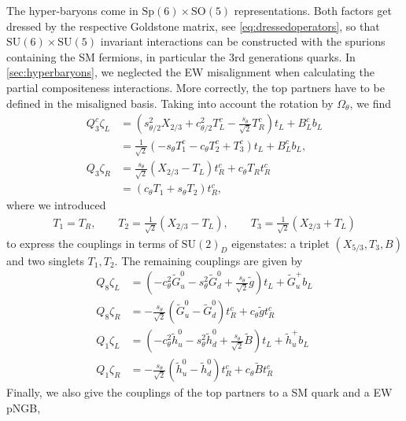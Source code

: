 \documentclass[preprintnumbers,nofootinbib,showpacs,eqsecnum,pre,12pt]{revtex4-1}
\newcommand{\SO}{\text{SO}}
\newcommand{\SU}{\text{SU}}
\newcommand{\Sp}{\text{Sp}}
\begin{document}
The hyper-baryons come in $\Sp(6)\times \SO(5)$ representations. Both factors get
dressed by the respective Goldstone matrix, see \cref{eq:dressedoperators}, so that $\SU(6)\times \SU(5)$ invariant
interactions can be constructed with the spurions containing the SM fermions, in particular
the 3rd generations quarks. 
In \cref{sec:hyperbaryons}, we neglected the EW misalignment when calculating the partial compositeness interactions.
More correctly, the top partners have to be defined in the misaligned basis.
Taking into account the rotation by $\Omega_\theta$, we find
\begin{align}
    Q_3^c \zeta_L 
	&= \left( s_{\theta/2}^2 X_{2/3} + c_{\theta/2}^2 T^c_L - \frac{s_\theta}{\sqrt{2}} T^{ c}_R \right) t_L+B^c_L b_L  \\ 
	&= 	\frac{1}{\sqrt{2}} \left( -s_\theta T_1^c- c_\theta T_2^c + T_3^c \right) t_L+ B^c_L b_L,\\
	Q_3 \zeta_R &= \frac{s_\theta}{\sqrt{2}} (X_{2/3} -T_L) t_R^c + c_\theta T_R t_R^c \\ &= (c_\theta T_1 + s_\theta T_2) t_R^c,
\end{align}
where we introduced 
\begin{align}
T_1 = T_R ,\qquad T_2 = \frac{1}{\sqrt{2}} \left( X_{2/3} - T_L \right)
,\qquad T_3 = \frac{1}{\sqrt{2}} \left( X_{2/3} + T_L \right) 
\end{align}
to express the couplings in terms of $\SU(2)_D$ eigenstates:
a triplet $(X_{5/3},T_3,B)$  and two singlets $T_1,T_2$.
The remaining couplings are given by
\begin{align}
	Q_8 \zeta_L &= \left( -c_\theta^2 \tilde G_u^0- s_\theta^2 \tilde G_d^0 + \frac{s_\theta}{\sqrt{2}} \tilde g \right) t_L + \tilde G_u^+ b_L \\
	Q_8 \zeta_R &= - \frac{s_\theta}{\sqrt{2}} \left(\tilde G_u^0-\tilde G_d^0 \right) t_R^c + c_\theta \tilde g t_R^c \\
	Q_1 \zeta_L &= \left( -c_\theta^2 \tilde h_u^0- s_\theta^2 \tilde h_d^0 + \frac{s_\theta}{\sqrt{2}} \tilde B \right) t_L + \tilde h_u^+ b_L \\
	Q_1 \zeta_R &= - \frac{s_\theta}{\sqrt{2}} \left(\tilde h_u^0-\tilde h_d^0 \right) t_R^c + c_\theta \tilde B t_R^c
\end{align}
Finally, we also give the couplings of the top partners to a SM quark and a EW pNGB, \begingroup\allowdisplaybreaks
\end{document}
